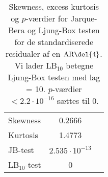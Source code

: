 \begin{table}
\center
\begin{tabular}{lcc} \toprule
Skewness & 0.2666 \\
Kurtosis & 1.4773 \\
JB-test & \(2.535 \cdot 10^{-13}\) \\ 
LB$_{10}$-test & 0 \\ \bottomrule
\end{tabular}
\caption{Skewness, excess kurtosis og \(p\)-værdier for Jarque-Bera og Ljung-Box testen for de standardiserede residualer af en \(\text{AR} \del{4}\). Vi lader LB$_{10}$ betegne Ljung-Box testen med lag = 10. 
\(p\)-værdier \(< 2.2 \cdot 10^{-16}\) sættes til 0.} \label{tab:test_ar}
\end{table}